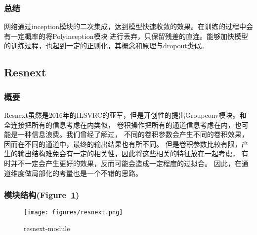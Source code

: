 \documentclass{article}
\begin{document}
\begin{CJK}{UTF8}{gbsn}
\subsubsection{总结}
网络通过inception模块的二次集成，达到模型快速收敛的效果。在训练的过程中会有一定概率的将Polyinception模块
进行丢弃，只保留残差的直连。能够加快模型的训练过程，也起到一定的正则化，其概念和原理与dropout类似。


\subsection{Resnext}
\subsubsection{概要}
Resnext虽然是2016年的ILSVRC的亚军，但是开创性的提出Groupconv模块。和全连接把所有的信息考虑在内类似，
卷积操作把所有的通道信息考虑在内，也可能是一种信息浪费。我们曾经了解过，
不同的卷积参数会产生不同的卷积效果，因而在不同的通道中，最终的输出结果也有所不同。
但是卷积参数比较有限，产生的输出结构难免会有一定的相关性，因此将这些相关的特征放在一起考虑，
有时并不一定会产生更好的效果，反而可能会造成一定程度的过拟合。
因此，在通道维度做局部化的考量也是一个不错的思路。


\subsubsection{模块结构(Figure~\ref{fig:resnextM})}
    \begin{figure}
        \centering
        \texttt{[image: figures/resnext.png]}
        \caption{resnext-module}
        \label{fig:resnextM}
    \end{figure}



\end{CJK}
\end{document}
